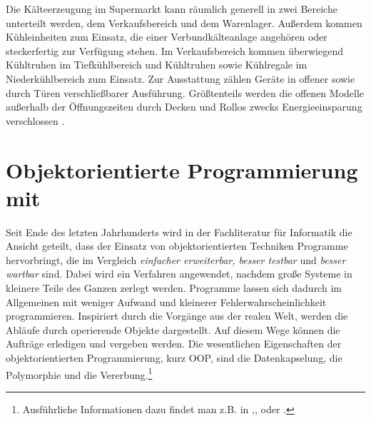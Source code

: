 Die K\"alteerzeugung im Supermarkt kann r\"aumlich generell in zwei Bereiche
unterteilt werden, dem Verkaufsbereich und dem Warenlager. Au\ss erdem kommen
K\"uhleinheiten zum Einsatz, die einer Verbundk\"alteanlage angeh\"oren oder
steckerfertig zur Verf\"ugung stehen. Im Verkaufsbereich kommen \"uberwiegend
K\"uhltruhen im Tiefk\"uhlbereich und K\"uhltruhen sowie K\"uhlregale im
Niederk\"uhlbereich zum Einsatz. Zur Ausstattung z\"ahlen Ger\"ate in offener
sowie durch T\"uren verschlie\ss barer Ausf\"uhrung. Gr\"o\ss tenteils werden
die offenen Modelle au\ss erhalb der \"Offnungszeiten durch Decken und Rollos
zwecks Energieeinsparung verschlossen \cite{leghart}.


\section{Objektorientierte Programmierung mit \matlab}
\label{sec:OOP}
Seit Ende des letzten Jahrhunderts wird in der Fachliteratur für Informatik
die Ansicht geteilt, dass der Einsatz von objektorientierten Techniken Programme
hervorbringt, die im Vergleich \textit{einfacher erweiterbar, besser testbar}
und \textit{besser wartbar} sind\cite{OOP}. Dabei wird ein Verfahren angewendet,
nachdem große Systeme in kleinere Teile des Ganzen zerlegt werden. Programme
lassen sich dadurch im Allgemeinen mit weniger Aufwand und kleinerer
Fehlerwahrscheinlichkeit programmieren. Inspiriert durch die Vorgänge aus der
realen Welt, werden die Abläufe durch operierende Objekte dargestellt. Auf
diesem Wege k\"onnen die Aufträge erledigen und vergeben werden. Die
wesentlichen Eigenschaften der objektorientierten Programmierung, kurz
OOP, sind die Datenkapselung, die
Polymorphie und die Vererbung.\footnote{ Ausführliche Informationen dazu findet
man z.B. in \cite{OOP},\cite{pepperOOP},\cite{java} oder \cite{python}.}


